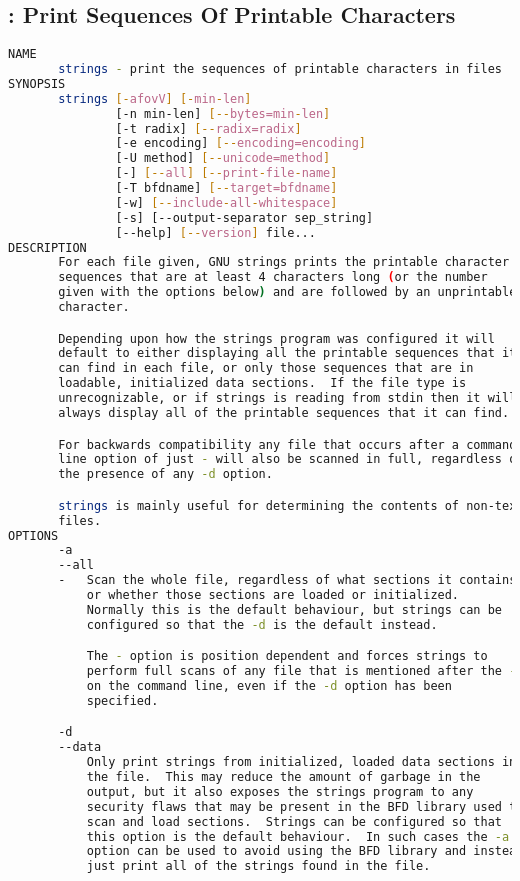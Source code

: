 % 
\subsection{: Print Sequences Of Printable Characters}

{\tiny{
\begin{lstlisting}[language=bash]
NAME
       strings - print the sequences of printable characters in files
SYNOPSIS
       strings [-afovV] [-min-len]
               [-n min-len] [--bytes=min-len]
               [-t radix] [--radix=radix]
               [-e encoding] [--encoding=encoding]
               [-U method] [--unicode=method]
               [-] [--all] [--print-file-name]
               [-T bfdname] [--target=bfdname]
               [-w] [--include-all-whitespace]
               [-s] [--output-separator sep_string]
               [--help] [--version] file...
DESCRIPTION
       For each file given, GNU strings prints the printable character
       sequences that are at least 4 characters long (or the number
       given with the options below) and are followed by an unprintable
       character.

       Depending upon how the strings program was configured it will
       default to either displaying all the printable sequences that it
       can find in each file, or only those sequences that are in
       loadable, initialized data sections.  If the file type is
       unrecognizable, or if strings is reading from stdin then it will
       always display all of the printable sequences that it can find.

       For backwards compatibility any file that occurs after a command-
       line option of just - will also be scanned in full, regardless of
       the presence of any -d option.

       strings is mainly useful for determining the contents of non-text
       files.
OPTIONS
       -a
       --all
       -   Scan the whole file, regardless of what sections it contains
           or whether those sections are loaded or initialized.
           Normally this is the default behaviour, but strings can be
           configured so that the -d is the default instead.

           The - option is position dependent and forces strings to
           perform full scans of any file that is mentioned after the -
           on the command line, even if the -d option has been
           specified.

       -d
       --data
           Only print strings from initialized, loaded data sections in
           the file.  This may reduce the amount of garbage in the
           output, but it also exposes the strings program to any
           security flaws that may be present in the BFD library used to
           scan and load sections.  Strings can be configured so that
           this option is the default behaviour.  In such cases the -a
           option can be used to avoid using the BFD library and instead
           just print all of the strings found in the file.


\end{lstlisting}}}
